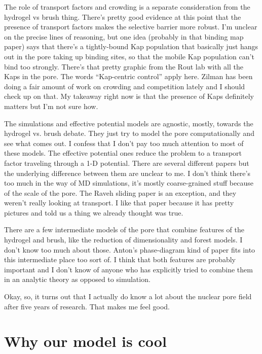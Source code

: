 {The role of transport factors and crowding is a separate consideration from the hydrogel vs brush thing.  There's pretty good evidence at this point that the presence of transport factors makes the selective barrier more robust.  I'm unclear on the precise lines of reasoning, but one idea (probably in that binding map paper) says that there's a tightly-bound Kap population that basically just hangs out in the pore taking up binding sites, so that the mobile Kap population can't bind too strongly.  There's that pretty graphic from the Rout lab with all the Kaps in the pore.  The words ``Kap-centric control'' apply here.  Zilman has been doing a fair amount of work on crowding and competition lately and I should check up on that.  My takeaway right now is that the presence of Kaps definitely matters but I'm not sure how.

The simulations and effective potential models are agnostic, mostly, towards the hydrogel vs. brush debate.  They just try to model the pore computationally and see what comes out.  I confess that I don't pay too much attention to most of these models.  The effective potential ones reduce the problem to a transport factor traveling through a 1-D potential.  There are several different papers but the underlying difference between them are unclear to me.  I don't think there's too much in the way of MD simulations, it's mostly coarse-grained stuff because of the scale of the pore.  The Raveh sliding paper is an exception, and they weren't really looking at transport.  I like that paper because it has pretty pictures and told us a thing we already thought was true.

There are a few intermediate models of the pore that combine features of the hydrogel and brush, like the reduction of dimensionality and forest models.  I don't know too much about those.  Anton's phase-diagram kind of paper fits into this intermediate place too sort of.  I think that both features are probably important and I don't know of anyone who has explicitly tried to combine them in an analytic theory as opposed to simulation.

Okay, so, it turns out that I actually do know a lot about the nuclear pore field after five years of research.  That makes me feel good.

\section{Why our model is cool}

}
